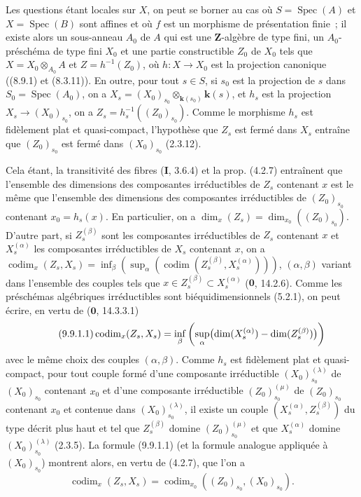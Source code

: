 Les questions étant locales sur $X$, on peut se borner au cas où
$S=\operatorname{Spec}(A)$ et $X=\operatorname{Spec}(B)$ sont affines et où
$f$ est un morphisme de présentation finie~; il existe alors un sous-anneau
$A_0$ de $A$ qui est une $\mathbf Z$-algèbre de type fini, un
$A_0$-préschéma de type fini $X_0$ et une partie constructible $Z_0$ de $X_0$
tels que $X=X_0\otimes_{A_0}A$ et $Z=h^{-1}(Z_0)$, où $h:X\to X_0$ est la
projection canonique ((8.9.1) et (8.3.11)). En outre, pour tout $s\in S$, si
$s_0$ est la projection de $s$ dans $S_0=\operatorname{Spec}(A_0)$, on a
$X_s=(X_0)_{s_0}\otimes_{\mathbf{k}(s_0)}\boldsymbol{k}(s)$,
et $h_s$ est la projection $X_s\to(X_0)_{s_0}$, on a
$Z_s=h_s^{-1}((Z_0)_{s_0})$. Comme le morphisme $h_s$ est fidèlement plat et
quasi-compact, l'hypothèse que $Z_s$ est fermé dans $X_s$ entraîne que
$(Z_0)_{s_0}$ est fermé dans $(X_0)_{s_0}$ (2.3.12).

Cela étant, la transitivité des fibres (\textbf{I}, 3.6.4) et la prop. (4.2.7)
entraînent que l'ensemble des dimensions des composantes irréductibles de
$Z_s$ contenant $x$ est le même que l'ensemble des dimensions des composantes
irréductibles de $(Z_0)_{s_0}$ contenant $x_0=h_s(x)$. En particulier, on a
$\dim_x(Z_s)=\dim_{x_0}((Z_0)_{s_0})$. D'autre part, si $Z_s^{(\beta)}$ sont les
composantes irréductibles de $Z_s$ contenant $x$ et $X_s^{(\alpha)}$ les
composantes irréductibles de $X_s$
contenant $x$, on a $\operatorname{codim}_x(Z_s,X_s)=
\inf_\beta(\sup_\alpha
(\operatorname{codim}(Z_s^{(\beta)},X_s^{(\alpha)})))$,
$(\alpha,\beta)$ variant dans l'ensemble des couples tels que
$x\in Z_s^{(\beta)}\subset X_s^{(\alpha)}$ ($\mathbf 0$, 14.2.6). Comme les
préschémas algébriques irréductibles sont biéquidimensionnels (5.2.1), on peut
écrire, en vertu de ($\mathbf 0$, 14.3.3.1)
\begin{equation}
\tag{9.9.1.1}
\label{IV.9.9.1.1-fr}
\operatorname{codim}_x(Z_s,X_s)=
\inf_\beta\left(\sup_\alpha
\bigl(\dim(X_s^{(\alpha)})-\dim(Z_s^{(\beta)})\bigr)\right)
\end{equation}
avec le même choix des couples $(\alpha,\beta)$. Comme $h_s$ est fidèlement
plat et quasi-compact, pour tout couple formé d'une composante irréductible
$(X_0)_{s_0}^{(\lambda)}$ de $(X_0)_{s_0}$ contenant $x_0$ et d'une composante
irréductible $(Z_0)_{s_0}^{(\mu)}$ de $(Z_0)_{s_0}$ contenant $x_0$ et contenue
dans $(X_0)_{s_0}^{(\lambda)}$, il existe un couple
$(X_s^{(\alpha)},Z_s^{(\beta)})$ du type décrit plus haut et tel que
$Z_s^{(\beta)}$ domine $(Z_0)_{s_0}^{(\mu)}$ et que $X_s^{(\alpha)}$ domine
$(X_0)_{s_0}^{(\lambda)}$ (2.3.5). La formule (9.9.1.1) (et la formule analogue
appliquée à $(X_0)_{s_0}$) montrent alors, en vertu de (4.2.7), que l'on a
\[
\operatorname{codim}_x(Z_s,X_s)=
\operatorname{codim}_{x_0}((Z_0)_{s_0},(X_0)_{s_0}).
\]

